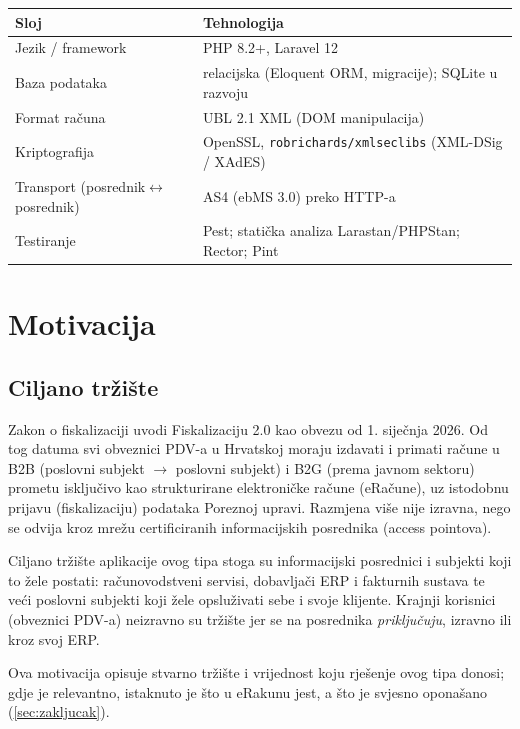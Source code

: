 \documentclass[11pt,a4paper]{article}
\renewenvironment{leftbar}{%
  \def\FrameCommand{\hspace{0pt}\vrule width 2pt\hspace{8pt}}%
  \MakeFramed{\advance\hsize-\width \FrameRestore}}%
 {\endMakeFramed}
\begin{document}
\begin{tabularx}{\textwidth}{@{}lY@{}}
\toprule
\textbf{Sloj} & \textbf{Tehnologija} \\
\midrule
Jezik / framework & PHP 8.2+, Laravel 12 \\
Baza podataka & relacijska (Eloquent ORM, migracije); SQLite u razvoju \\
Format računa & UBL 2.1 XML (DOM manipulacija) \\
Kriptografija & OpenSSL, \texttt{robrichards/xmlseclibs} (XML-DSig / XAdES) \\
Transport (posrednik$\leftrightarrow$posrednik) & AS4 (ebMS 3.0) preko HTTP-a \\
Testiranje & Pest; statička analiza Larastan/PHPStan; Rector; Pint \\
\bottomrule
\end{tabularx}

\section{Motivacija}

\subsection{Ciljano tržište}

Zakon o fiskalizaciji uvodi Fiskalizaciju 2.0 kao obvezu od 1. siječnja 2026.
Od tog datuma svi obveznici PDV-a u Hrvatskoj moraju izdavati i primati račune u
B2B (poslovni subjekt $\rightarrow$ poslovni subjekt) i B2G (prema javnom sektoru)
prometu isključivo kao strukturirane elektroničke račune (eRačune), uz istodobnu
prijavu (fiskalizaciju) podataka Poreznoj upravi. Razmjena više nije izravna, nego se
odvija kroz mrežu certificiranih informacijskih posrednika (access pointova).

Ciljano tržište aplikacije ovog tipa stoga su informacijski posrednici i subjekti koji
to žele postati: računovodstveni servisi, dobavljači ERP i fakturnih sustava te veći poslovni
subjekti koji žele opsluživati sebe i svoje klijente. Krajnji korisnici (obveznici PDV-a)
neizravno su tržište jer se na posrednika \emph{priključuju}, izravno ili kroz svoj ERP.

\begin{leftbar}
Ova motivacija opisuje stvarno tržište i vrijednost koju rješenje ovog tipa donosi; gdje
je relevantno, istaknuto je što u eRakunu jest, a što je svjesno oponašano (\ref{sec:zakljucak}).
\end{leftbar}
\end{document}
